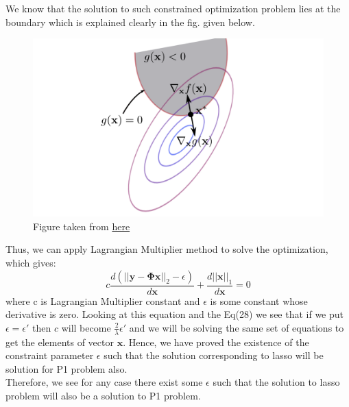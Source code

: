 \documentclass[12pt]{article}
\begin{document}
We know that the solution to such constrained optimization problem lies at the boundary which is explained clearly in the fig. given below.
\begin{figure}[H]
  \centering
  \includegraphics[scale=0.7]{fig6.png}  %
  \caption{Figure taken from \href{http://www.juyang.co/numerical-optimization-in-machine-learning-iii-constrained-optimization/}{here}}
  \label{fig:9}
\end{figure}
Thus, we can apply Lagrangian Multiplier method to solve the optimization, which gives:
\begin{equation*}
    c\frac{d(||\boldsymbol{y-\Phi x}||_2-\epsilon)}{d\boldsymbol{x}} + \frac{d||\boldsymbol{x}||_1}{d\boldsymbol{x}} = 0
\end{equation*}
where c is Lagrangian Multiplier constant and $\epsilon$ is some constant whose derivative is zero. Looking at this equation and the Eq(28) we see that if we put $\epsilon = \epsilon'$ then $c$ will become $\frac{2}{\lambda}\epsilon'$ and we will be solving the same set of equations to get the elements of vector $\boldsymbol{x}$. Hence, we have proved the existence of the constraint parameter $\epsilon$ such that the solution corresponding to lasso will be solution for P1 problem also.\\
Therefore, we see for any case there exist some $\epsilon$ such that the solution to lasso problem will also be a solution to P1 problem.
\end{document}
